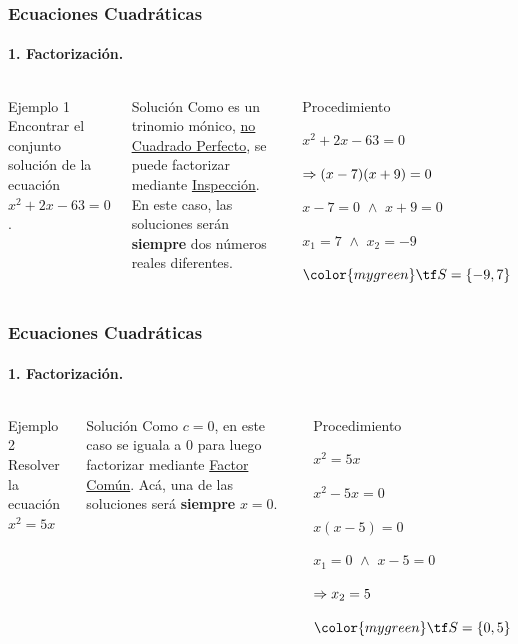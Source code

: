 \documentclass[mathserif]{beamer}
\begin{document}
\begin{frame}
\frametitle{\bf Ecuaciones Cuadráticas} 
\framesubtitle{1. Factorización.}

    \begin{columns}
        \begin{exampleblock}{Ejemplo 1}
        Encontrar el conjunto solución de la ecuación $x^2+2x-63=0$.
        \end{exampleblock}
\pause
        \begin{block}{Solución}
        Como es un trinomio mónico, \underline{no Cuadrado Perfecto}, se puede facto\-ri\-zar mediante \underline{Inspección}. En este caso, las soluciones serán \alert<2>{\bf siempre} dos números reales diferentes. 
        \end{block}
\pause
        \begin{block}{Procedimiento}
            \benu
            \item[] <4-| alert@4>$x^2+2x-63=0$
            \item[] <5-| alert@5>$\Rightarrow (x-7)(x+9)=0$
            \item[] <6-| alert@6>$x-7=0\,\,\wedge\,\,x+9=0$
            \item[] <7-| alert@7>$x_1=7\,\,\wedge\,\,x_2=-9$
            \item[] <8->{\bm $\color{mygreen}\tf S=\{-9,7\}$}
            \eenu
        \end{block}
    \end{columns}
\end{frame}


\begin{frame}
\frametitle{\bf Ecuaciones Cuadráticas} 
\framesubtitle{1. Factorización.}

    \begin{columns}
        \begin{exampleblock}{Ejemplo 2}
        \bc
        Resolver la ecuación $x^2=5x$
        \ec
        \end{exampleblock}
\pause
        \begin{block}{Solución}
        Como $c=0$, en este caso se iguala a $0$ para luego factorizar mediante \underline{Factor Común}. Acá, una de las soluciones será \alert<2>{\bf siempre} $x=0$. 
        \end{block}
\pause
        \begin{block}{Procedimiento}
            \benu
            \item[] <4-| alert@4> $x^2=5x$
            \item[] <5-| alert@5> $x^2-5x=0$
            \item[] <6-| alert@6> $x(x-5)=0$
            \item[] <7-| alert@7> $x_1=0\,\,\wedge\,\,x-5=0$
            \item[] <8-| alert@8> $\Rightarrow x_2=5$
            \item[] <9-> {\bm $\color{mygreen}\tf S=\{0,5\}$}
            \eenu
        \end{block}
    \end{columns}
\end{frame}
\end{document}
